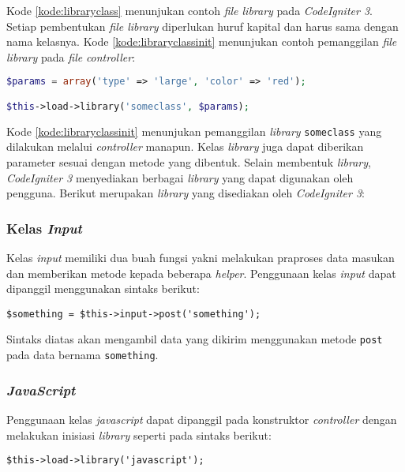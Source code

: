 Kode \ref{kode:libraryclass} menunjukan contoh \textit{file library} pada \textit{CodeIgniter 3}. Setiap pembentukan \textit{file library} diperlukan huruf kapital dan harus sama dengan nama kelasnya. Kode \ref{kode:libraryclassinit} menunjukan contoh pemanggilan \textit{file} \textit{library} pada \textit{file} \textit{controller}:

\begin{lstlisting}[language=PHP, caption=Contoh pemanggilan \textit{library} pada \textit{file} \textit{controller}, label=kode:libraryclassinit]
$params = array('type' => 'large', 'color' => 'red');

$this->load->library('someclass', $params);
\end{lstlisting}

Kode \ref{kode:libraryclassinit} menunjukan pemanggilan \textit{library} \texttt{someclass} yang dilakukan melalui \textit{controller} manapun. Kelas \textit{library} juga dapat diberikan parameter sesuai dengan metode yang dibentuk. Selain membentuk \textit{library}, \textit{CodeIgniter 3} menyediakan berbagai \textit{library} yang dapat digunakan oleh pengguna. Berikut merupakan \textit{library} yang disediakan oleh \textit{CodeIgniter 3}:

\subsubsection{Kelas \textit{Input}}
Kelas \textit{input} memiliki dua buah fungsi yakni melakukan praproses data masukan dan memberikan metode kepada beberapa \textit{helper}. Penggunaan kelas \textit{input} dapat dipanggil menggunakan sintaks berikut:
\begin{center}
	\verb|$something = $this->input->post('something');|
\end{center}
Sintaks diatas akan mengambil data yang dikirim menggunakan metode \texttt{post} pada data bernama \texttt{something}.

\subsubsection{\textit{JavaScript}}
Penggunaan kelas \textit{javascript} dapat dipanggil pada konstruktor \textit{controller} dengan melakukan inisiasi \textit{library} seperti pada sintaks berikut:

\begin{center}
\verb|$this->load->library('javascript');|
\end{center}

